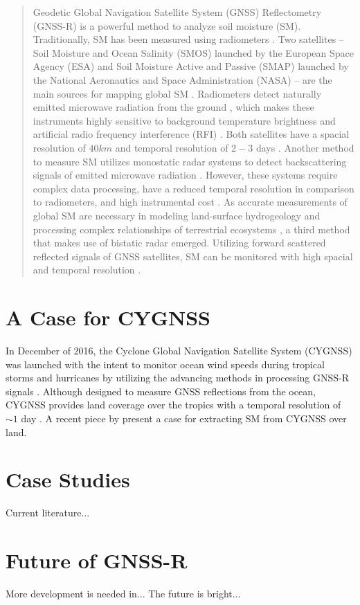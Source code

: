 \documentclass{article}
\begin{document}

\begin{abstract}
    \normalsize
    \vspace{1em}
    
Geodetic Global Navigation Satellite System (GNSS) Reflectometry (GNSS-R) is a powerful method to analyze soil moisture (SM). Traditionally, SM has been measured using radiometers \cite{CYGNSS}. Two satellites -- Soil Moisture and Ocean Salinity (SMOS) launched by the European Space Agency (ESA) and Soil Moisture Active and Passive (SMAP) launched by the National Aeronautics and Space Administration (NASA) -- are the main sources for mapping global SM \cite{GNSS_R_Spaceborn_Challenges, Semiempirical_Modeling}. Radiometers detect naturally emitted microwave radiation from the ground \cite{CYGNSS, GNSS_R_Spaceborn_Challenges}, which makes these instruments highly sensitive to background temperature brightness and artificial radio frequency interference (RFI) \cite{GNSS_R_Spaceborn_Challenges}. Both satellites have a spacial resolution of $40km$ and temporal resolution of $2-3$ days \cite{CYGNSS}. Another method to measure SM utilizes monostatic radar systems to detect backscattering signals of emitted microwave radiation \cite{CYGNSS}. However, these systems require complex data processing, have a reduced temporal resolution in comparison to radiometers, and high instrumental cost \cite{GNSS_R_Spaceborn_Challenges}. As accurate measurements of global SM are necessary in modeling land-surface hydrogeology \cite{Semiempirical_Modeling} and processing complex relationships of terrestrial ecosystems \cite{CYGNSS}, a third method that makes use of bistatic radar emerged. Utilizing forward scattered reflected signals of GNSS satellites, SM can be monitored with high spacial and temporal resolution \cite{GNSS_R_Spaceborn_Challenges}.
\end{abstract}

\section{A Case for CYGNSS}
In December of 2016, the Cyclone Global Navigation Satellite System (CYGNSS) was launched with the intent to monitor ocean wind speeds during tropical storms and hurricanes by utilizing the advancing methods in processing GNSS-R signals   \cite{GNSS_R_Spaceborn_Challenges}. Although designed to measure GNSS reflections from the ocean, CYGNSS provides land coverage over the tropics with a temporal resolution of $\sim 1$ day \cite{CYGNSS}. A recent piece by \citeauthor{CYGNSS} present a case for extracting SM from CYGNSS over land.

\section{Case Studies}
Current literature...

\section{Future of GNSS-R}
More development is needed in...
The future is bright...

\clearpage
\printbibliography
\end{document}
